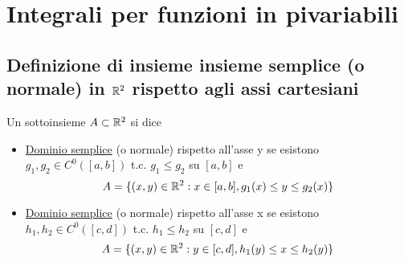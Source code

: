 \section{Integrali per funzioni in pi\acu variabili}
\subsection{Definizione di insieme insieme semplice (o normale) in $\mathbb{R}^2$
rispetto agli assi cartesiani}
\begin{definition}
  Un sottoinsieme $A \subset \mathbb{R}^2$ si dice 
  \begin{itemize}
    \item \underline{Dominio semplice} (o normale) rispetto all'asse y se esistono 
          $g_1, g_2 \in C^0([a,b])$ t.c. $g_1 \leq g_2$ su $[a,b]$ e 
          $$A = \{(x,y)\in\mathbb{R}^2 : x \in [a,b], g_1(x) \leq y \leq g_2(x)\}$$
    \item \underline{Dominio semplice} (o normale) rispetto all'asse x se esistono 
          $h_1, h_2 \in C^0([c,d])$ t.c. $h_1 \leq h_2$ su $[c,d]$ e 
          $$A = \{(x,y)\in\mathbb{R}^2 : y \in [c,d], h_1(y) \leq x \leq h_2(y)\}$$
  \end{itemize}
\end{definition}